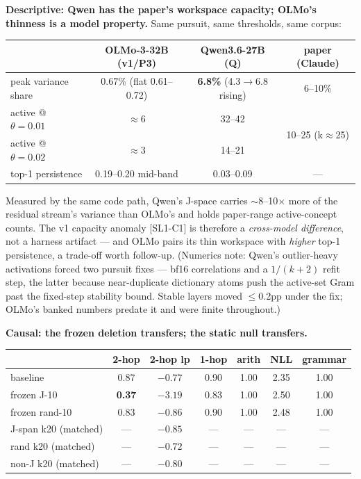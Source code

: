 \documentclass[10pt]{article}
\begin{document}
\textbf{Descriptive: Qwen has the paper's workspace capacity; OLMo's
thinness is a model property.} Same pursuit, same thresholds, same
corpus:

\begin{center}\small
\begin{tabular}{lccc}
\toprule
 & OLMo-3-32B (v1/P3) & Qwen3.6-27B (Q) & paper (Claude) \\
\midrule
peak variance share & 0.67\% (flat 0.61--0.72) & \textbf{6.8\%} (4.3$\to$6.8 rising) & 6--10\% \\
active @ $\theta{=}0.01$ & $\approx$6 & 32--42 & \multirow{2}{*}{10--25 (k$\approx$25)} \\
active @ $\theta{=}0.02$ & $\approx$3 & 14--21 & \\
top-1 persistence & 0.19--0.20 mid-band & 0.03--0.09 & --- \\
\bottomrule
\end{tabular}
\end{center}

Measured by the same code path, Qwen's J-space carries $\sim$8--10$\times$
more of the residual stream's variance than OLMo's and holds
paper-range active-concept counts. The v1 capacity anomaly [SL1-C1] is
therefore a \emph{cross-model difference}, not a harness artifact ---
and OLMo pairs its thin workspace with \emph{higher} top-1 persistence,
a trade-off worth follow-up. (Numerics note: Qwen's outlier-heavy
activations forced two pursuit fixes --- bf16 correlations and a
$1/(k{+}2)$ refit step, the latter because near-duplicate dictionary
atoms push the active-set Gram past the fixed-step stability bound.
Stable layers moved $\le$0.2pp under the fix; OLMo's banked numbers
predate it and were finite throughout.)

\textbf{Causal: the frozen deletion transfers; the static null
transfers.}

\begin{center}\small
\begin{tabular}{lcccccc}
\toprule
 & 2-hop & 2-hop lp & 1-hop & arith & NLL & grammar \\
\midrule
baseline        & 0.87 & $-0.77$ & 0.90 & 1.00 & 2.35 & 1.00 \\
frozen J-10     & \textbf{0.37} & $\mathbf{-3.19}$ & 0.83 & 1.00 & 2.50 & 1.00 \\
frozen rand-10  & 0.83 & $-0.86$ & 0.90 & 1.00 & 2.48 & 1.00 \\
\midrule
J-span k20 (matched) & --- & $-0.85$ & --- & --- & --- & --- \\
rand k20 (matched)   & --- & $-0.72$ & --- & --- & --- & --- \\
non-J k20 (matched)  & --- & $-0.80$ & --- & --- & --- & --- \\
\bottomrule
\end{tabular}
\end{center}
\end{document}
